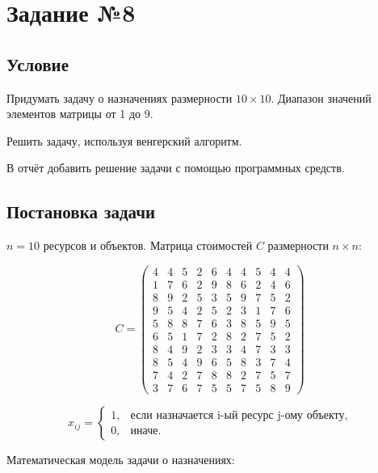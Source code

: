 \section{Задание №8}\label{08-lab}

\subsection{Условие}\label{08-lab-condition}

Придумать задачу о назначениях размерности $10 \times 10$. Диапазон значений элементов матрицы от 1 до 9.

Решить задачу, используя венгерский алгоритм.

В отчёт добавить решение задачи с помощью программных средств.

\subsection{Постановка задачи}\label{08-lab-statement}

$n = 10$ ресурсов и объектов. Матрица стоимостей $C$ размерности $n \times n$:

\[
    C = \begin{pmatrix}
        4 & 4 & 5 & 2 & 6 & 4 & 4 & 5 & 4 & 4 \\
        1 & 7 & 6 & 2 & 9 & 8 & 6 & 2 & 4 & 6 \\
        8 & 9 & 2 & 5 & 3 & 5 & 9 & 7 & 5 & 2 \\
        9 & 5 & 4 & 2 & 5 & 2 & 3 & 1 & 7 & 6 \\
        5 & 8 & 8 & 7 & 6 & 3 & 8 & 5 & 9 & 5 \\
        6 & 5 & 1 & 7 & 2 & 8 & 2 & 7 & 5 & 2 \\
        8 & 4 & 9 & 2 & 3 & 3 & 4 & 7 & 3 & 3 \\
        8 & 5 & 4 & 9 & 6 & 5 & 8 & 3 & 7 & 4 \\
        7 & 4 & 2 & 7 & 8 & 8 & 2 & 7 & 5 & 7 \\
        3 & 7 & 6 & 7 & 5 & 5 & 7 & 5 & 8 & 9
    \end{pmatrix}
\]

\[
    x_{ij} = \begin{cases}
        1, & \text{если назначается i-ый ресурс j-ому объекту}, \\
        0, & \text{иначе}.
    \end{cases}
\]

Математическая модель задачи о назначениях:

